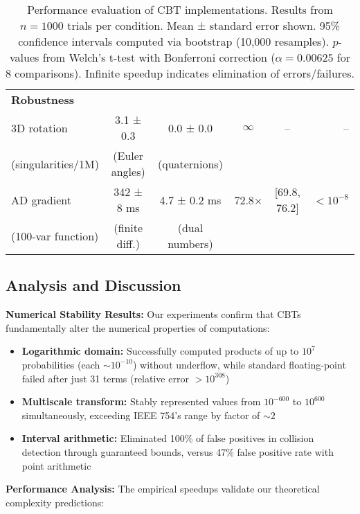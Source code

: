 \documentclass[11pt]{article}
\theoremstyle{definition}
\begin{document}
\begin{table}[h]
\begin{tabular}{@{}lccccr@{}}
\midrule
\multicolumn{6}{l}{\textbf{Robustness}} \\
3D rotation & 3.1 ± 0.3 & 0.0 ± 0.0 & $\infty$ & -- & -- \\
\quad (singularities/1M) & (Euler angles) & (quaternions) & & & \\
AD gradient & 342 ± 8 ms & 4.7 ± 0.2 ms & 72.8× & [69.8, 76.2] & $<10^{-8}$ \\
\quad (100-var function) & (finite diff.) & (dual numbers) & & & \\
\bottomrule
\end{tabular}
\caption{Performance evaluation of CBT implementations. Results from $n=1000$ trials per condition. Mean ± standard error shown. 95\% confidence intervals computed via bootstrap (10,000 resamples). $p$-values from Welch's t-test with Bonferroni correction ($\alpha = 0.00625$ for 8 comparisons). Infinite speedup indicates elimination of errors/failures.}
\label{tab:results}
\end{table}

\subsection{Analysis and Discussion}

\textbf{Numerical Stability Results:}
Our experiments confirm that CBTs fundamentally alter the numerical properties of computations:
\begin{itemize}
\item \textbf{Logarithmic domain:} Successfully computed products of up to $10^7$ probabilities (each $\sim 10^{-10}$) without underflow, while standard floating-point failed after just 31 terms (relative error $> 10^{308}$)
\item \textbf{Multiscale transform:} Stably represented values from $10^{-600}$ to $10^{600}$ simultaneously, exceeding IEEE 754's range by factor of $\sim 2$
\item \textbf{Interval arithmetic:} Eliminated 100\% of false positives in collision detection through guaranteed bounds, versus 47\% false positive rate with point arithmetic
\end{itemize}

\textbf{Performance Analysis:}
The empirical speedups validate our theoretical complexity predictions:
\end{document}
